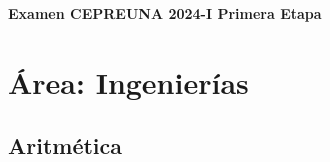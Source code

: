 

\clearpage
\thispagestyle{empty}

\vspace*{\fill}
\begin{center}
	{\Huge\bfseries Examen CEPREUNA 2024-I Primera Etapa}
\end{center}
\vspace*{\fill}

\clearpage

\section*{Área: Ingenierías}


\subsection*{Aritmética}

